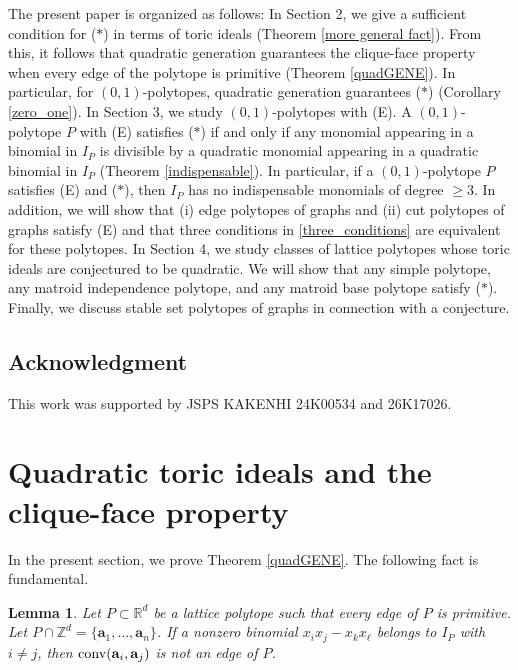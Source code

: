 \documentclass[12pt]{amsart}
\newtheorem{lemma}[thm]{Lemma}
\theoremstyle{definition}
\numberwithin{thm}{section}
\numberwithin{equation}{section}
\def\NZQ{\mathbb}               %
\def\ZZ{{\NZQ Z}}
\def\RR{{\NZQ R}}
\def\ab{{\mathbf a}}
\begin{document}
The present paper is organized as follows:
In Section 2, we give a sufficient condition for ($*$) in terms of toric ideals (Theorem \ref{more general fact}).
From this, it follows that quadratic generation guarantees the clique-face property when every edge of the polytope is primitive (Theorem \ref{quadGENE}).
In particular, for $(0,1)$-polytopes, quadratic generation guarantees ($*$) (Corollary \ref{zero_one}).
In Section 3, we study $(0,1)$-polytopes with (E).
        A $(0,1)$-polytope $P$ with (E) satisfies ($*$) if and only if any monomial appearing in a binomial in $I_P$ is divisible by a quadratic monomial appearing in a quadratic binomial in $I_P$ (Theorem \ref{indispensable}).
In particular,     
    if a $(0,1)$-polytope $P$ satisfies (E) and ($*$), then $I_P$ has no indispensable monomials of degree $\ge 3$.  
In addition, we will show that (i) edge polytopes of graphs and (ii) cut polytopes of graphs satisfy (E) and that
three conditions in \eqref{three_conditions} are equivalent for these polytopes.
In Section 4, we study classes of lattice polytopes whose toric ideals are conjectured to be quadratic.
We will show that any simple polytope, any matroid independence polytope, and any matroid base polytope satisfy ($*$).
Finally, we discuss stable set polytopes of graphs in connection with a conjecture.


\subsection*{Acknowledgment}
This work was supported by 
JSPS KAKENHI 24K00534 and 26K17026.

\section{Quadratic toric ideals and the clique-face property}

In the present section, we prove Theorem \ref{quadGENE}.
The following fact is fundamental.

\begin{lemma}\label{key}
Let $P \subset \RR^d$ be a lattice polytope
such that every edge of $P$ is primitive.
Let $P \cap \ZZ^d = \{\ab_1,\ldots,\ab_n\}$.
If a nonzero binomial $x_i x_j - x_k x_\ell$ 
belongs to $I_P$ with $i\neq j$, then ${\rm conv}(\ab_i , \ab_j)$ is not an edge of $P$.
\end{lemma}
\end{document}
